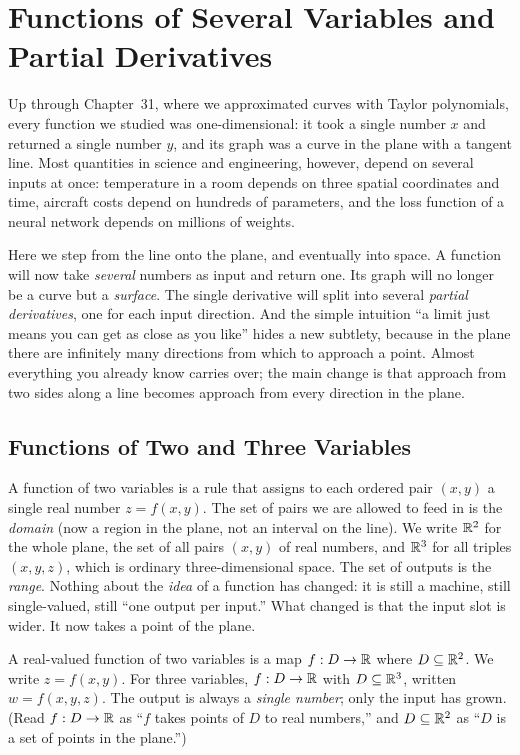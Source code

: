 \chapter{Functions of Several Variables and Partial Derivatives}
\label{ch32:several-variables-partial-derivatives}

Up through Chapter~31, where we approximated curves with Taylor polynomials, every function we
studied was one-dimensional: it took a single number $x$ and returned a single number $y$, and
its graph was a curve in the plane with a tangent line. Most quantities in science and
engineering, however, depend on several inputs at once: temperature in a room depends on three
spatial coordinates and time, aircraft costs depend on hundreds of parameters, and the loss
function of a neural network depends on millions of weights.

Here we step from the line onto the plane, and eventually into space. A function will now take
\emph{several} numbers as input and return one. Its graph will no
longer be a curve but a \emph{surface}. The single derivative will split into several
\emph{partial derivatives}, one for each input direction. And the simple intuition ``a
limit just means you can get as close as you like'' hides a new
subtlety, because in the plane there are infinitely many directions from which to approach a
point. Almost everything you already know carries over; the main change is that approach from
two sides along a line becomes approach from every direction in the plane.

\section{Functions of Two and Three Variables}
\label{ch32:sec-functions}

A function of two variables is a rule that assigns to each ordered pair $(x,y)$ a single
real number $z = f(x,y)$. The set of pairs we are allowed to feed in is the \emph{domain}
(now a region in the plane, not an interval on the line). We write $\mathbb{R}^2$ for the whole plane,
the set of all pairs $(x,y)$ of real numbers, and $\mathbb{R}^3$ for all triples $(x,y,z)$, which is
ordinary three-dimensional space. The set of outputs is
the \emph{range}. Nothing about the \emph{idea} of a function has changed: it is still a
machine, still single-valued, still ``one output per input.'' What changed is that the input
slot is wider. It now takes a point of the plane.

\begin{focusbox}
A real-valued function of two variables is a map $f : D \to \mathbb{R}$ where $D \subseteq \mathbb{R}^2$.
We write $z = f(x,y)$. For three variables, $f : D \to \mathbb{R}$ with $D \subseteq \mathbb{R}^3$, written
$w = f(x,y,z)$. The output is always a \emph{single number}; only the input has grown.
(Read $f : D \to \mathbb{R}$ as ``$f$ takes points of $D$ to real numbers,'' and $D \subseteq \mathbb{R}^2$
as ``$D$ is a set of points in the plane.'')
\end{focusbox}


